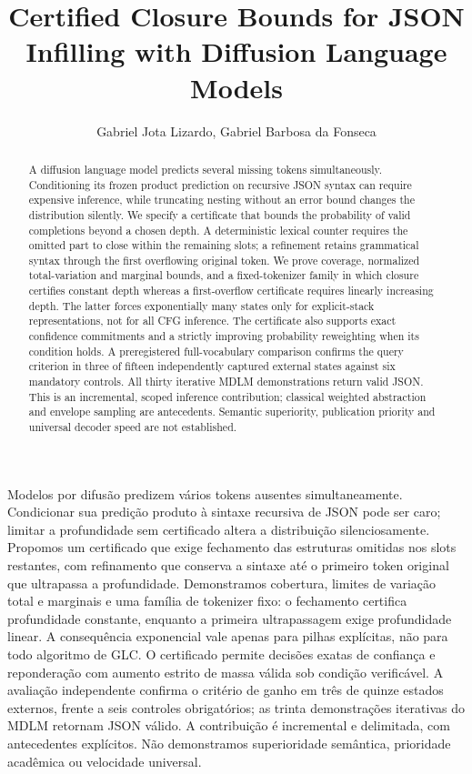 \documentclass[12pt]{article}
\title{Certified Closure Bounds for JSON Infilling with Diffusion Language Models}
\author{Gabriel Jota Lizardo\inst{1}, Gabriel Barbosa da Fonseca\inst{1}}
\theoremstyle{readable}
\begin{document}
\maketitle

\begin{abstract}
A diffusion language model predicts several missing tokens simultaneously.
Conditioning its frozen product prediction on recursive JSON syntax can require
expensive inference, while truncating nesting without an error bound changes
the distribution silently. We specify a certificate that bounds the probability
of valid completions beyond a chosen depth. A deterministic lexical counter
requires the omitted part to close within the remaining slots; a refinement
retains grammatical syntax through the first overflowing original token.
We prove coverage, normalized total-variation and marginal bounds, and a
fixed-tokenizer family in which closure certifies constant depth whereas a
first-overflow certificate requires linearly increasing depth. The latter
forces exponentially many states only for explicit-stack representations,
not for all CFG inference. The certificate also supports exact confidence
commitments and a strictly improving probability reweighting when its condition
holds. A preregistered full-vocabulary comparison confirms the query criterion
in three of fifteen independently captured external states against six
mandatory controls. All thirty iterative MDLM demonstrations return valid JSON.
This is an incremental, scoped inference contribution; classical weighted
abstraction and envelope sampling are antecedents. Semantic superiority,
publication priority and universal decoder speed are not established.
\end{abstract}

\begin{otherlanguage}{brazilian}
\begin{resumo}
Modelos por difusão predizem vários tokens ausentes simultaneamente.
Condicionar sua predição produto à sintaxe recursiva de JSON pode ser caro;
limitar a profundidade sem certificado altera a distribuição silenciosamente.
Propomos um certificado que exige fechamento das estruturas omitidas nos
slots restantes, com refinamento que conserva a sintaxe até o primeiro token
original que ultrapassa a profundidade. Demonstramos cobertura, limites de
variação total e marginais e uma família de tokenizer fixo: o fechamento
certifica profundidade constante, enquanto a primeira ultrapassagem exige
profundidade linear. A consequência exponencial vale apenas para pilhas
explícitas, não para todo algoritmo de GLC. O certificado permite decisões
exatas de confiança e reponderação com aumento estrito de massa válida sob
condição verificável. A avaliação independente confirma o critério de ganho
em três de quinze estados externos, frente a seis controles obrigatórios;
as trinta demonstrações iterativas do MDLM retornam JSON válido. A contribuição
é incremental e delimitada, com antecedentes explícitos. Não demonstramos
superioridade semântica, prioridade acadêmica ou velocidade universal.
\end{resumo}
\end{otherlanguage}
\end{document}
